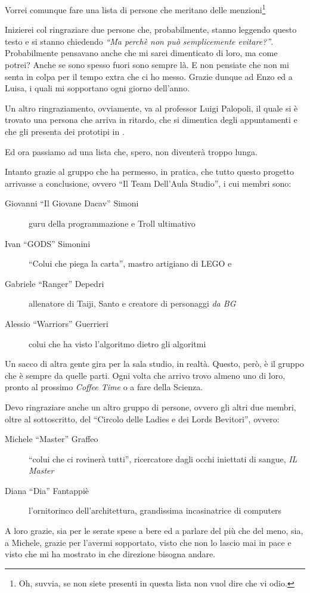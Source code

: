 Vorrei comunque fare una lista di persone che meritano delle
menzioni\footnote{Oh, suvvia, se non siete presenti in questa lista non
vuol dire che vi odio.}

Inizierei col ringraziare due persone che, probabilmente, stanno leggendo
questo testo e si stanno chiedendo \emph{``Ma perchè non può semplicemente
evitare?''}. Probabilmente pensavano anche che mi sarei dimenticato di
loro, ma come potrei? Anche se sono spesso fuori sono sempre là. E non
pensiate che non mi senta in colpa per il tempo extra che ci ho messo.
Grazie dunque ad Enzo ed a Luisa, i quali mi sopportano ogni giorno
dell'anno.

Un altro ringraziamento, ovviamente, va al professor Luigi Palopoli, il
quale si è trovato una persona che arriva in ritardo, che si dimentica
degli appuntamenti e che gli presenta dei prototipi in .

Ed ora passiamo ad una lista che, spero, non diventerà troppo lunga.

Intanto grazie al gruppo che ha permesso, in pratica, che tutto questo
progetto arrivasse a conclusione, ovvero ``Il Team Dell'Aula Studio'', i
cui membri sono:
\begin{description}
    \item[Giovanni ``Il Giovane Dacav'' Simoni]guru della programmazione e
        Troll ultimativo
    \item[Ivan ``GODS'' Simonini]``Colui che piega la carta'', mastro
        artigiano di LEGO e 
    \item[Gabriele ``Ranger'' Depedri]allenatore di Taiji, Santo e creatore
        di personaggi \emph{da BG}
    \item[Alessio ``Warriors'' Guerrieri]colui che ha visto l'algoritmo
        dietro gli algoritmi
\end{description}
Un sacco di altra gente gira per la sala studio, in realtà. Questo, però, è
il gruppo che è sempre da quelle parti. Ogni volta che arrivo trovo almeno
uno di loro, pronto al prossimo \emph{Coffee Time} o a fare della Scienza.

Devo ringraziare anche un altro gruppo di persone, ovvero gli altri due
membri, oltre al sottoscritto, del ``Circolo delle Ladies e dei Lords
Bevitori'', ovvero:
\begin{description}
    \item[Michele ``Master'' Graffeo]``colui che ci rovinerà tutti'',
        ricercatore dagli occhi iniettati di sangue, \emph{IL Master}
    \item[Diana ``Dia'' Fantappiè]l'ornitorinco dell'architettura,
        grandissima incasinatrice di computers
\end{description}
A loro grazie, sia per le serate spese a bere ed a parlare del più che del
meno, sia, a Michele, grazie per l'avermi sopportato, visto che non lo
lascio mai in pace e visto che mi ha mostrato in che direzione bisogna
andare.

